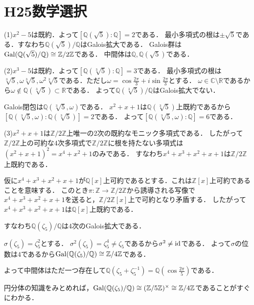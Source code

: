 \documentclass[
		book,
		head_space=20mm,
		foot_space=20mm,
		gutter=10mm,
		line_length=190mm
]{jlreq}
\begin{document}
\section{H25数学選択}
(1)$x^2-5$は既約．よって$[\mathbb{Q}(\sqrt{5}):\mathbb{Q}]=2$である．
最小多項式の根は$\pm \sqrt{5}$である．すなわち$\mathbb{Q}(\sqrt{5})/\mathbb{Q}$はGalois拡大である．
Galois群は$\mathop{\mathrm{Gal}}(\mathbb{Q}(\sqrt{5})/\mathbb{Q})\cong\mathbb{Z}/2\mathbb{Z}$である．
中間体は$\mathbb{Q},\mathbb{Q}(\sqrt{5})$である．

(2)$x^3-5$は既約．よって$[\mathbb{Q}(\sqrt[3]{5}):\mathbb{Q}]=3$である．
最小多項式の根は$\sqrt[3]{5},\omega \sqrt[3]{5},\omega^2 \sqrt[3]{5}$である．ただし$\omega=\cos\frac{2\pi}{3}+i\sin\frac{2\pi}{3}$とする．
$\omega\in \mathbb{C}\setminus \mathbb{R}$であるから$\omega\notin \mathbb{Q}(\sqrt[3]{5})\subset \mathbb{R}$である．
よって$\mathbb{Q}(\sqrt[3]{5})/\mathbb{Q}$はGalois拡大でない．

Galois閉包は$\mathbb{Q}(\sqrt[3]{5},\omega)$である．
$x^2+x+1$は$\mathbb{Q}(\sqrt[3]{5})$上既約であるから$[\mathbb{Q}(\sqrt[3]{5},\omega):\mathbb{Q}(\sqrt[3]{5})]=2$である．
よって$[\mathbb{Q}(\sqrt[3]{5},\omega):\mathbb{Q}]=6$である．

(3)$x^2+x+1$は$\mathbb{Z}/2 \mathbb{Z}$上唯一の$2$次の既約なモニック多項式である．
したがって$\mathbb{Z}/2 \mathbb{Z}$上の可約な$4$次多項式で$\mathbb{Z}/2 \mathbb{Z}$に根を持たない多項式は$(x^2+x+1)^2=x^4+x^2+1$のみである．
すなわち$x^4+x^3+x^2+x+1$は$\mathbb{Z}/2 \mathbb{Z}$上既約である．

仮に$x^4+x^3+x^2+x+1$が$\mathbb{Q}[x]$上可約であるとする．これは$\mathbb{Z}[x]$上可約であることを意味する．
このとき$\pi\colon \mathbb{Z} \rightarrow \mathbb{Z}/2 \mathbb{Z}$から誘導される写像で$x^4+x^3+x^2+x+1$を送ると，$\mathbb{Z}/2 \mathbb{Z}[x]$上で可約となり矛盾する．
したがって$x^4+x^3+x^2+x+1$は$\mathbb{Q}[x]$上既約である．

すなわち$\mathbb{Q}(\zeta_5)/\mathbb{Q}$は$4$次のGalois拡大である．

$\sigma(\zeta_5)=\zeta_5^2$とする．
$\sigma^2(\zeta_5)=\zeta_5^4\neq \zeta_5$であるから$\sigma^2\neq \mathop{\mathrm{id}}$である．
よって$\sigma$の位数は$4$であるから$\mathop{\mathrm{Gal}}(\mathbb{Q}(\zeta_5)/\mathbb{Q})\cong \mathbb{Z}/4 \mathbb{Z}$である．

よって中間体はただ一つ存在して$\mathbb{Q}(\zeta_5+\zeta_5^{-1})=\mathbb{Q}(\cos \frac{2\pi}{5})$である．
\begin{tcolorbox}[blanker,breakable,
	left=3mm,right=3mm,
	top=3mm,bottom=3mm,
	before skip=15pt,after skip=15pt,
	borderline vertical={1pt}{0pt}{black,dotted}]
	円分体の知識をみとめれば，$\mathop{\mathrm{Gal}}(\mathbb{Q}(\zeta_5)/\mathbb{Q})\cong (\mathbb{Z}/5 \mathbb{Z})^\times\cong \mathbb{Z}/4 \mathbb{Z}$であることがすぐにわかる．
	\end{tcolorbox}
\end{document}
